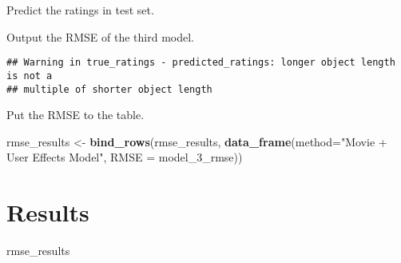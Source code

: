 \documentclass[]{article}
\newenvironment{Shaded}{\begin{snugshade}}{\end{snugshade}}
\newcommand{\KeywordTok}[1]{\textcolor[rgb]{0.13,0.29,0.53}{\textbf{#1}}}
\newcommand{\DataTypeTok}[1]{\textcolor[rgb]{0.13,0.29,0.53}{#1}}
\newcommand{\StringTok}[1]{\textcolor[rgb]{0.31,0.60,0.02}{#1}}
\newcommand{\OperatorTok}[1]{\textcolor[rgb]{0.81,0.36,0.00}{\textbf{#1}}}
\newcommand{\NormalTok}[1]{#1}
\begin{document}
Predict the ratings in test set.

\begin{Shaded}
\end{Shaded}

Output the RMSE of the third model.

\begin{Shaded}
\end{Shaded}

\begin{verbatim}
## Warning in true_ratings - predicted_ratings: longer object length is not a
## multiple of shorter object length
\end{verbatim}

Put the RMSE to the table.

\begin{Shaded}
\begin{Highlighting}[]
\NormalTok{rmse_results <-}\StringTok{ }\KeywordTok{bind_rows}\NormalTok{(rmse_results,}
                          \KeywordTok{data_frame}\NormalTok{(}\DataTypeTok{method=}\StringTok{"Movie + User Effects Model"}\NormalTok{,  }
                                     \DataTypeTok{RMSE =}\NormalTok{ model_3_rmse))}
\end{Highlighting}
\end{Shaded}

\section{Results}\label{results}

\begin{Shaded}
\begin{Highlighting}[]
\NormalTok{rmse_results}
\end{Highlighting}
\end{Shaded}
\end{document}
